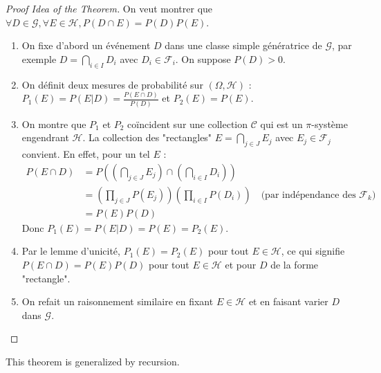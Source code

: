 \begin{proof}[Proof Idea of the Theorem]
On veut montrer que $\forall D \in \mathcal{G}, \forall E \in \mathcal{H}, P(D \cap E) = P(D)P(E)$.
\begin{enumerate}
    \item On fixe d'abord un événement $D$ dans une classe simple génératrice de $\mathcal{G}$, par exemple $D = \bigcap_{i \in I} D_i$ avec $D_i \in \mathcal{F}_i$. On suppose $P(D)>0$.
    \item On définit deux mesures de probabilité sur $(\Omega, \mathcal{H})$ : $P_1(E) = P(E|D) = \frac{P(E \cap D)}{P(D)}$ et $P_2(E) = P(E)$.
    \item On montre que $P_1$ et $P_2$ coïncident sur une collection $\mathcal{C}$ qui est un $\pi$-système engendrant $\mathcal{H}$. La collection des "rectangles" $E = \bigcap_{j \in J} E_j$ avec $E_j \in \mathcal{F}_j$ convient. En effet, pour un tel $E$ :
    \begin{align*}
    P(E \cap D) &= P\left( \left(\bigcap_{j \in J} E_j\right) \cap \left(\bigcap_{i \in I} D_i\right) \right) \\
    &= \left( \prod_{j \in J} P(E_j) \right) \left( \prod_{i \in I} P(D_i) \right) \quad \text{(par indépendance des } \mathcal{F}_k) \\
    &= P(E) P(D)
    \end{align*}
    Donc $P_1(E) = P(E|D) = P(E) = P_2(E)$.
    \item Par le lemme d'unicité, $P_1(E) = P_2(E)$ pour tout $E \in \mathcal{H}$, ce qui signifie $P(E \cap D) = P(E)P(D)$ pour tout $E \in \mathcal{H}$ et pour $D$ de la forme "rectangle".
    \item On refait un raisonnement similaire en fixant $E \in \mathcal{H}$ et en faisant varier $D$ dans $\mathcal{G}$.
\end{enumerate}
\end{proof}%
This theorem is generalized by recursion.%

